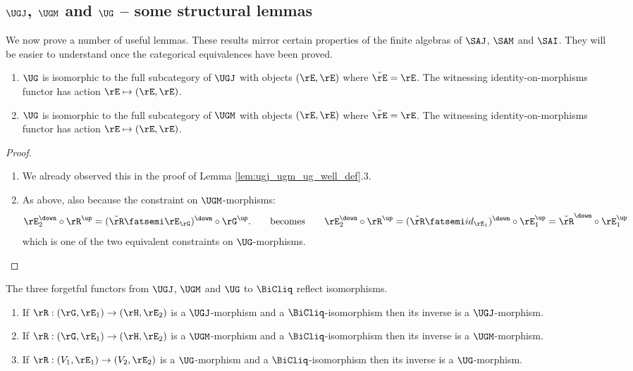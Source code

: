 \documentclass{article}
\begin{document}
\subsection{$\UGJ$, $\UGM$ and $\UG$ -- some structural lemmas}

We now prove a number of useful lemmas. These results mirror certain properties of the finite algebras of $\SAJ$, $\SAM$ and $\SAI$. They will be easier to understand once the categorical equivalences have been proved.
\smallskip


\begin{lemma}
\label{lem:ug_iso_to_diagonals}
\item
\begin{enumerate}
\item
$\UG$ is isomorphic to the full subcategory of $\UGJ$ with objects $(\rE,\rE)$ where $\breve{\rE} = \rE$. The witnessing identity-on-morphisms functor has action $\rE \mapsto (\rE,\rE)$.

\item
$\UG$ is isomorphic to the full subcategory of $\UGM$ with objects $(\rE,\rE)$ where $\breve{\rE} = \rE$. The witnessing identity-on-morphisms functor has action $\rE \mapsto (\rE,\rE)$.
\end{enumerate}
\end{lemma}

\begin{proof}
\item
\begin{enumerate}
\item
We already observed this in the proof of Lemma \ref{lem:ugj_ugm_ug_well_def}.3.

\item
As above, also because the constraint on $\UGM$-morphisms:
\[
\rE_2^\down \circ \rR^\up
= (\breve{\rR} \fatsemi \rE_\rG)^\down \circ \rG^\up.
\qquad\text{becomes}\qquad
\rE_2^\down \circ \rR^\up
= (\breve{\rR} \fatsemi id_{\rE_1})^\down \circ \rE_1^\up
= \breve{\rR}^\down \circ \rE_1^\up
\]
which is one of the two equivalent constraints on $\UG$-morphisms.
\end{enumerate}
\end{proof}


\begin{lemma}
\label{lem:ug_reflect_iso}
\item
The three forgetful functors from $\UGJ$, $\UGM$ and $\UG$ to $\BiCliq$ reflect isomorphisms.
\begin{enumerate}
\item
If $\rR : (\rG,\rE_1) \to (\rH,\rE_2)$ is a $\UGJ$-morphism and a $\BiCliq$-isomorphism then its inverse is a $\UGJ$-morphism.
\item
If $\rR : (\rG,\rE_1) \to (\rH,\rE_2)$ is a $\UGM$-morphism and a $\BiCliq$-isomorphism then its inverse is a $\UGM$-morphism.
\item
If $\rR : (V_1,\rE_1) \to (V_2,\rE_2)$ is a $\UG$-morphism and a $\BiCliq$-isomorphism then its inverse is a $\UG$-morphism.

\end{enumerate}
\end{lemma}
\end{document}
